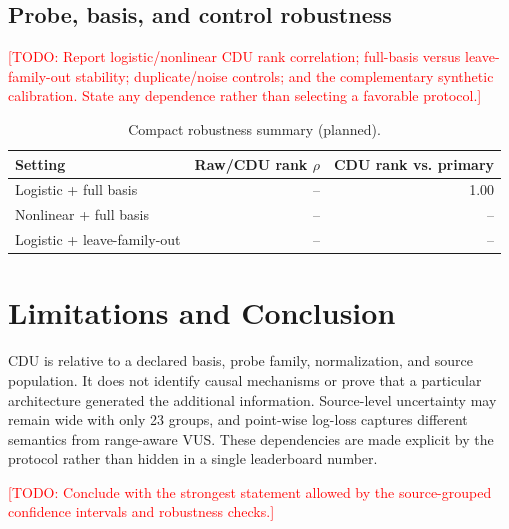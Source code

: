 \documentclass[conference]{IEEEtran}
\newcommand{\todo}[1]{\textcolor{red}{[TODO: #1]}}
\begin{document}
\subsection{Probe, basis, and control robustness}
\todo{Report logistic/nonlinear CDU rank correlation; full-basis versus leave-family-out stability; duplicate/noise controls; and the complementary synthetic calibration. State any dependence rather than selecting a favorable protocol.}

\begin{table}[t]
\centering
\caption{Compact robustness summary (planned).}
\label{tab:robust}
\small
\begin{tabular}{lrr}
\toprule
Setting & Raw/CDU rank $\rho$ & CDU rank vs. primary\\
\midrule
Logistic + full basis & -- & 1.00\\
Nonlinear + full basis & -- & --\\
Logistic + leave-family-out & -- & --\\
\bottomrule
\end{tabular}
\end{table}

\section{Limitations and Conclusion}
CDU is relative to a declared basis, probe family, normalization, and source population. It does not identify causal mechanisms or prove that a particular architecture generated the additional information. Source-level uncertainty may remain wide with only 23 groups, and point-wise log-loss captures different semantics from range-aware VUS. These dependencies are made explicit by the protocol rather than hidden in a single leaderboard number.

\todo{Conclude with the strongest statement allowed by the source-grouped confidence intervals and robustness checks.}



\end{document}
